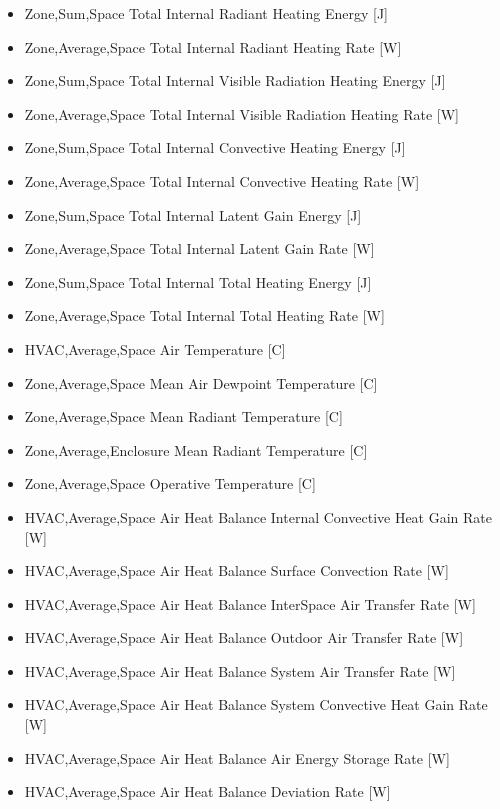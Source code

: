 \begin{itemize}
\item
  Zone,Sum,Space Total Internal Radiant Heating Energy {[}J{]}
\item
  Zone,Average,Space Total Internal Radiant Heating Rate {[}W{]}
\item
  Zone,Sum,Space Total Internal Visible Radiation Heating Energy {[}J{]}
\item
  Zone,Average,Space Total Internal Visible Radiation Heating Rate {[}W{]}
\item
  Zone,Sum,Space Total Internal Convective Heating Energy {[}J{]}
\item
  Zone,Average,Space Total Internal Convective Heating Rate {[}W{]}
\item
  Zone,Sum,Space Total Internal Latent Gain Energy {[}J{]}
\item
  Zone,Average,Space Total Internal Latent Gain Rate {[}W{]}
\item
  Zone,Sum,Space Total Internal Total Heating Energy {[}J{]}
\item
  Zone,Average,Space Total Internal Total Heating Rate {[}W{]}
\item
  HVAC,Average,Space Air Temperature {[}C{]}
\item
  Zone,Average,Space Mean Air Dewpoint Temperature {[}C{]}
\item
  Zone,Average,Space Mean Radiant Temperature {[}C{]}
\item
  Zone,Average,Enclosure Mean Radiant Temperature {[}C{]}
\item
  Zone,Average,Space Operative Temperature {[}C{]}
\item
  HVAC,Average,Space Air Heat Balance Internal Convective Heat Gain Rate {[}W{]}
\item
  HVAC,Average,Space Air Heat Balance Surface Convection Rate {[}W{]}
\item
  HVAC,Average,Space Air Heat Balance InterSpace Air Transfer Rate {[}W{]}
\item
  HVAC,Average,Space Air Heat Balance Outdoor Air Transfer Rate {[}W{]}
\item
  HVAC,Average,Space Air Heat Balance System Air Transfer Rate {[}W{]}
\item
  HVAC,Average,Space Air Heat Balance System Convective Heat Gain Rate {[}W{]}
\item
  HVAC,Average,Space Air Heat Balance Air Energy Storage Rate {[}W{]}
\item
  HVAC,Average,Space Air Heat Balance Deviation Rate {[}W{]}

\end{itemize}

